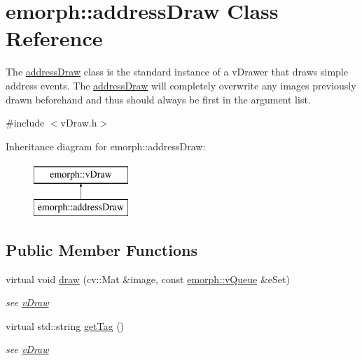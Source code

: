 \hypertarget{classemorph_1_1addressDraw}{\section{emorph\-:\-:address\-Draw Class Reference}
\label{classemorph_1_1addressDraw}
}


The \hyperlink{classemorph_1_1addressDraw}{address\-Draw} class is the standard instance of a v\-Drawer that draws simple address events. The \hyperlink{classemorph_1_1addressDraw}{address\-Draw} will completely overwrite any images previously drawn beforehand and thus should always be first in the argument list.  




{\ttfamily \#include $<$v\-Draw.\-h$>$}

Inheritance diagram for emorph\-:\-:address\-Draw\-:\begin{figure}[H]
\begin{center}
\leavevmode
\includegraphics[height=2.000000cm]{classemorph_1_1addressDraw}
\end{center}
\end{figure}
\subsection*{Public Member Functions}
\begin{DoxyCompactItemize}
\item 
\hypertarget{classemorph_1_1addressDraw_a31228f7f61455afb4b7b1536e601c854}{virtual void \hyperlink{classemorph_1_1addressDraw_a31228f7f61455afb4b7b1536e601c854}{draw} (cv\-::\-Mat \&image, const \hyperlink{classemorph_1_1vQueue}{emorph\-::v\-Queue} \&e\-Set)}\label{classemorph_1_1addressDraw_a31228f7f61455afb4b7b1536e601c854}

\begin{DoxyCompactList}\small\item\em see \hyperlink{classemorph_1_1vDraw}{v\-Draw} \end{DoxyCompactList}\item 
\hypertarget{classemorph_1_1addressDraw_a82a6050de6d2950cb6598b0f64cada24}{virtual std\-::string \hyperlink{classemorph_1_1addressDraw_a82a6050de6d2950cb6598b0f64cada24}{get\-Tag} ()}\label{classemorph_1_1addressDraw_a82a6050de6d2950cb6598b0f64cada24}

\begin{DoxyCompactList}\small\item\em see \hyperlink{classemorph_1_1vDraw}{v\-Draw} \end{DoxyCompactList}\end{DoxyCompactItemize}
